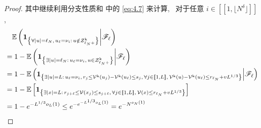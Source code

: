 \begin{proof}
{    }{
        其中继续利用分支性质和 中的 \eqref{eq:4.7} 来计算,~ 对于任意 $i\in[\![1,\lfloor N^\delta\rfloor]\!]$,
    }
    \begin{align*}
        &\quad
        \mathbb E\left(
            {\bf 1}_{
                \left\{
                    \forall|u|=\ell_N,\,
                    u_\ell=\nu_i:\,
                    u\notin
                    \mathcal Z^{\mathrm{k}}_{\ell_N+}
                \right\}
            }
            \middle|
            \mathscr F_\ell
        \right)
        \\
        &
        =
        1-
        \mathbb E\left(
            {\bf 1}_{
                \left\{
                    \exists|u|=\ell_N:\,
                    u_\ell=\nu_i,\,
                    u\in
                    \mathcal Z^{\mathrm{k}}_{\ell_N+}
                \right\}
            }
            \middle|
            \mathscr F_\ell
        \right)
        \\ &
        =
        1-
        \mathbb E\left(
            {\bf 1}_{
                \left\{
                    \exists|u|=L:\,
                    u_\ell=\nu_i,\,
                    r_j
                    \le
                    \mathcal V^{\mathrm{k}}(u_j)
                    -
                    \mathcal V^{\mathrm{k}}(u_\ell)
                    \le
                    s_j,\,
                    \forall j\in[\![1,L]\!],\,
                    \mathcal V^{\mathrm{k}}(u)
                    -
                    \mathcal V^{\mathrm{k}}(u_\ell)
                    \le
                    r_{\ell_N}+vL^{1/3}
                \right\}
            }
            \middle|
            \mathscr F_\ell
        \right)
        \\ &
        =
        1-
        \mathbb E\left[
            {\bf 1}_{
                \left\{
                    \exists|x|=L:\,
                    r_{j+\ell}
                    \le
                    \mathcal V(x_j)
                    \le
                    s_{j+\ell},\,
                    \forall j\in[\![1,L]\!],\,
                    \mathcal V(x)
                    \le
                    r_{\ell_N}+vL^{1/3}
                \right\}
            }
        \right]
        \\ &
        =
        1-e^{-L^{1/3}o_L(1)}
        \le
        e^{
            -e^{
                -L^{\text{\fontsize{6pt}{5pt}$1/3$}}
                o_{\text{\fontsize{5pt}{5pt}$L$}}{\text{\fontsize{6pt}{5pt}$(1)$}}
            }
        }
        =
        e^{
            -N^{
                o_{\text{\fontsize{5pt}{5pt}$N$}}{\text{\fontsize{6pt}{5pt}$(1)$}}
}}
\end{align*}
\end{proof}
